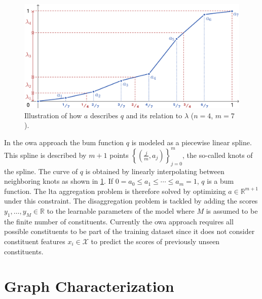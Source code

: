 \begin{figure}[ht]
	\centering
	\includegraphics[width=0.72\linewidth]{gfx/related-work/bum.pdf}
	\caption[Illustration of how a \ac{bum} function is described as a linear spline and its relation to the \ac{owa} weights.]{
		Illustration of how \textcolor{t_blue}{$a$} describes \textcolor{t_blue}{$q$} and its relation to \textcolor{t_red}{$\lambda$} ($n = 4$, $m = 7$).
	}\label{fig:related:bum}
\end{figure}
In the \ac{owa} approach the \ac{bum} function $q$ is modeled as a piecewise linear spline.
This spline is described by $m+1$ points ${\left\{ \left( \frac{j}{m}, a_j \right) \right\}}_{j = 0}^{m}$, the so-called knots of the spline. %
The curve of $q$ is obtained by linearly interpolating between neighboring knots as shown in \cref{fig:related:bum}.
If $0 = a_0 \leq a_1 \leq \cdots \leq a_m = 1$, $q$ is a \ac{bum} function.
The \ac{lta} aggregation problem is therefore solved by optimizing $a \in \mathbb{R}^{m + 1}$ under this constraint.
The disaggregation problem is tackled by adding the scores $y_1, \dots, y_M \in \mathbb{R}$ to the learnable parameters of the model where $M$ is assumed to be the finite number of constituents.
Currently the \ac{owa} approach requires all possible constituents to be part of the training dataset since it does not consider constituent features $x_i \in \mathcal{X}$ to predict the scores of previously unseen constituents.

\section{Graph Characterization}%
\label{sec:related:character}

